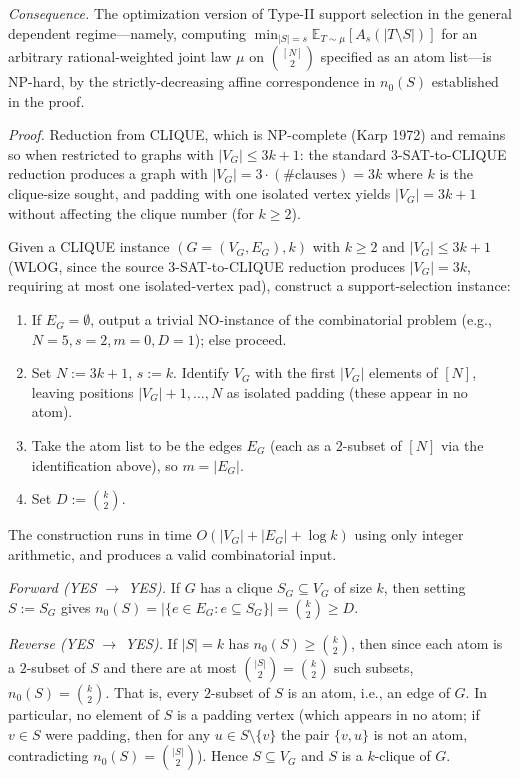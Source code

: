 \documentclass[
]{article}
\begin{document}
\emph{Consequence.} The optimization version of Type-II support selection
in the general dependent regime---namely, computing
$\min_{|S| = s} \mathbb{E}_{T \sim \mu}[A_s(|T \setminus S|)]$
for an arbitrary rational-weighted joint law $\mu$ on $\binom{[N]}{2}$
specified as an atom list---is NP-hard, by the strictly-decreasing
affine correspondence in $n_0(S)$ established in the proof.

\emph{Proof.} Reduction from CLIQUE, which is NP-complete (Karp 1972) and
remains so when restricted to graphs with $|V_G| \leq 3k+1$: the standard
3-SAT-to-CLIQUE reduction produces a graph with
$|V_G| = 3 \cdot (\#\text{clauses}) = 3k$ where $k$ is the clique-size
sought, and padding with one isolated vertex yields $|V_G| = 3k+1$
without affecting the clique number (for $k \geq 2$).

Given a CLIQUE instance $(G = (V_G, E_G), k)$ with $k \geq 2$ and
$|V_G| \leq 3k+1$ (WLOG, since the source 3-SAT-to-CLIQUE reduction
produces $|V_G| = 3k$, requiring at most one isolated-vertex pad),
construct a support-selection instance:
\begin{enumerate}
\item If $E_G = \emptyset$, output a trivial NO-instance of the
combinatorial problem (e.g., $N = 5, s = 2, m = 0, D = 1$); else proceed.
\item Set $N := 3k+1$, $s := k$. Identify $V_G$ with the first
$|V_G|$ elements of $[N]$, leaving positions $|V_G|+1, \ldots, N$
as isolated padding (these appear in no atom).
\item Take the atom list to be the edges $E_G$ (each as a $2$-subset of
$[N]$ via the identification above), so $m = |E_G|$.
\item Set $D := \binom{k}{2}$.
\end{enumerate}
The construction runs in time $O(|V_G| + |E_G| + \log k)$ using only
integer arithmetic, and produces a valid combinatorial input.

\emph{Forward (YES $\to$ YES).} If $G$ has a clique $S_G \subseteq V_G$
of size $k$, then setting $S := S_G$ gives
$n_0(S) = |\{e \in E_G : e \subseteq S_G\}| = \binom{k}{2} \geq D$.

\emph{Reverse (YES $\to$ YES).} If $|S| = k$ has $n_0(S) \geq \binom{k}{2}$,
then since each atom is a $2$-subset of $S$ and there are at most
$\binom{|S|}{2} = \binom{k}{2}$ such subsets, $n_0(S) = \binom{k}{2}$.
That is, every $2$-subset of $S$ is an atom, i.e., an edge of $G$. In
particular, no element of $S$ is a padding vertex (which appears in no
atom; if $v \in S$ were padding, then for any $u \in S \setminus \{v\}$
the pair $\{v, u\}$ is not an atom, contradicting $n_0(S) = \binom{|S|}{2}$).
Hence $S \subseteq V_G$ and $S$ is a $k$-clique of $G$.
\end{document}
